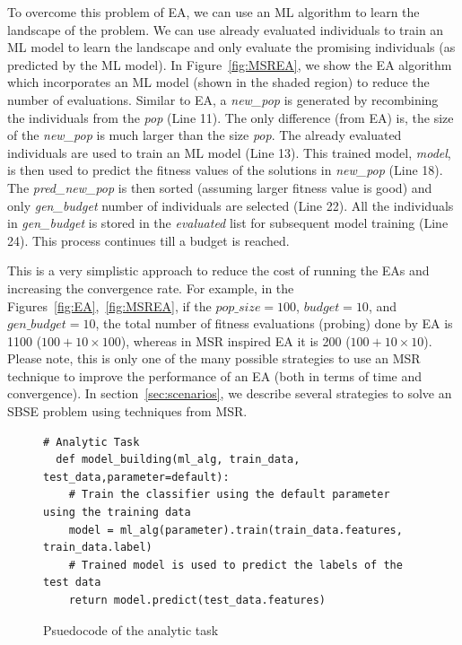 \documentclass[table, xcdraw, sigconf,review, anonymous]{acmart}
\begin{document}
To overcome this problem of EA, we can use an ML algorithm to learn the landscape of the problem. We can use already evaluated individuals to train an ML model to learn the landscape and only evaluate the promising individuals (as predicted by the ML model). In Figure~\ref{fig:MSREA}, we show the EA algorithm which incorporates an ML model (shown in the shaded region)  to reduce the number of evaluations. Similar to EA, a \textit{new\_pop} is generated by recombining the individuals from the \textit{pop} (Line 11). The only difference (from EA) is, the size of the \textit{new\_pop} is much larger than the size \textit{pop}. The already evaluated individuals are used to train an ML model (Line 13). This trained model, \textit{model}, is then used to predict the fitness values of the solutions in \textit{new\_pop} (Line 18). The \textit{pred\_new\_pop} is then sorted (assuming larger fitness value is good) and only \textit{gen\_budget} number of individuals are selected (Line 22). All the individuals in \textit{gen\_budget} is stored in the \textit{evaluated} list for subsequent model training (Line 24). This process continues till a budget is reached. 

This is a very simplistic approach to reduce the cost of running the EAs and increasing the convergence rate. For example, in the Figures~\ref{fig:EA},~\ref{fig:MSREA}, if the $\mathit{pop\_size}=100$, $\mathit{budget}=10$, and $\mathit{gen\_budget}=10$, the total number of fitness evaluations (probing) done by EA is 1100 ($100 + 10\times100$), whereas in MSR inspired EA it is 200 ($100 + 10\times10$). Please note, this is only one of the many possible strategies to use an MSR technique to improve the performance of an EA (both in terms of time and convergence). In section~\ref{sec:scenarios}, we describe several strategies to solve an SBSE problem using techniques from MSR. 


\begin{figure}[t]
\small
\hspace{0.4cm}
\begin{lstlisting}[xrightmargin=5.0ex,mathescape,frame=none,numbers=right]
  # Analytic Task
  def model_building(ml_alg, train_data, test_data,parameter=default):
    # Train the classifier using the default parameter using the training data
    model = ml_alg(parameter).train(train_data.features, train_data.label)
    # Trained model is used to predict the labels of the test data
    return model.predict(test_data.features)
\end{lstlisting}
\caption{\small{Psuedocode of the analytic task}
}
\label{fig:MSR_default}  
\end{figure}
\end{document}
